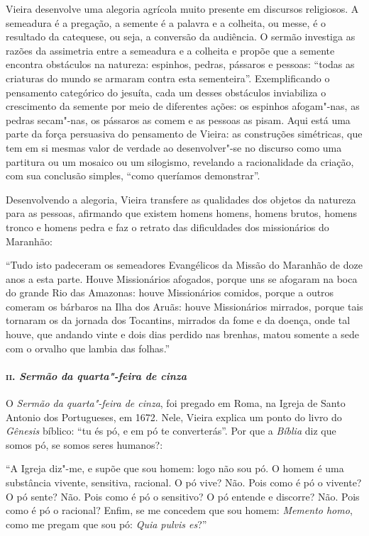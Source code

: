 Vieira desenvolve uma alegoria agrícola muito presente em discursos
religiosos. A semeadura é a pregação, a semente é a palavra e a
colheita, ou messe, é o resultado da catequese, ou seja, a conversão da
audiência. O sermão investiga as razões da assimetria entre a semeadura
e a colheita e propõe que a semente encontra obstáculos na natureza:
espinhos, pedras, pássaros e pessoas: ``todas as criaturas do mundo se
armaram contra esta sementeira''. Exemplificando o pensamento categórico
do jesuíta, cada um desses obstáculos inviabiliza o crescimento da
semente por meio de diferentes ações: os espinhos afogam"-nas, as pedras
secam"-nas, os pássaros as comem e as pessoas as pisam. Aqui está uma
parte da força persuasiva do pensamento de Vieira: as construções
simétricas, que tem em si mesmas valor de verdade ao desenvolver"-se no
discurso como uma partitura ou um mosaico ou um silogismo, revelando a
racionalidade da criação, com sua conclusão simples, ``como queríamos
demonstrar''.

Desenvolvendo a alegoria, Vieira transfere as qualidades dos objetos da
natureza para as pessoas, afirmando que existem homens homens, homens
brutos, homens tronco e homens pedra e faz o retrato das dificuldades
dos missionários do Maranhão:

``Tudo isto padeceram os semeadores Evangélicos da Missão do Maranhão de
doze anos a esta parte. Houve Missionários afogados, porque uns se
afogaram na boca do grande Rio das Amazonas: houve Missionários comidos,
porque a outros comeram os bárbaros na Ilha dos Aruãs: houve
Missionários mirrados, porque tais tornaram os da jornada dos Tocantins,
mirrados da fome e da doença, onde tal houve, que andando vinte e dois
dias perdido nas brenhas, matou somente a sede com o orvalho que lambia
das folhas.''

\paragraph{\textsc{ii}. \emph{Sermão da quarta"-feira de cinza}}

O \emph{Sermão da quarta"-feira de cinza}, foi pregado em Roma, na Igreja
de Santo Antonio dos Portugueses, em 1672. Nele, Vieira explica um ponto
do livro do \emph{Gênesis} bíblico: ``tu és pó, e em pó te
converterás''. Por que a \emph{Bíblia} diz que somos pó, se somos seres
humanos?:

``A Igreja diz"-me, e supõe que sou homem: logo não sou pó. O homem é uma
substância vivente, sensitiva, racional. O pó vive? Não. Pois como é pó
o vivente? O pó sente? Não. Pois como é pó o sensitivo? O pó entende e
discorre? Não. Pois como é pó o racional? Enfim, se me concedem que sou
homem: \emph{Memento homo}, como me pregam que sou pó: \emph{Quia pulvis
es}?''

